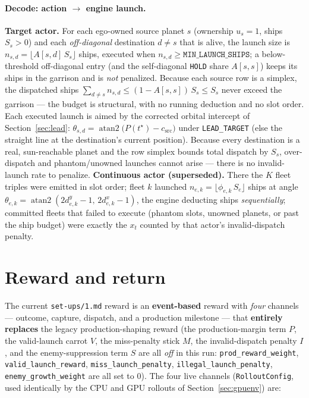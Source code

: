 \documentclass[11pt]{article}
\begin{document}
\paragraph{Decode: action $\to$ engine launch.}\label{sec:decode}
\textbf{Target actor.} For each ego-owned source planet $s$ (ownership $u_s=1$, ships $S_s>0$) and each
\emph{off-diagonal} destination $d\neq s$ that is alive, the launch size is
$n_{s,d}=\lfloor A[s,d]\,S_s\rfloor$ ships, executed when $n_{s,d}\ge\texttt{MIN\_LAUNCH\_SHIPS}$; a
below-threshold off-diagonal entry (and the self-diagonal \texttt{HOLD} share $A[s,s]$) keeps its ships
in the garrison and is \emph{not} penalized. Because each source row is a simplex, the dispatched ships
$\sum_{d\neq s}n_{s,d}\le(1-A[s,s])\,S_s\le S_s$ never exceed the garrison --- the budget is structural,
with no running deduction and no slot order. Each executed launch is aimed by the corrected orbital
intercept of Section~\ref{sec:lead}:
$\theta_{s,d}=\operatorname{atan2}\big(P(t^\star)-c_{\mathrm{src}}\big)$ under \texttt{LEAD\_TARGET}
(else the straight line at the destination's current position). Because every destination is a real,
sun-reachable planet and the row simplex bounds total dispatch by $S_s$, over-dispatch and
phantom/unowned launches cannot arise --- there is no invalid-launch rate to penalize.
\textbf{Continuous actor (superseded).} There the $K$ fleet triples were emitted in slot order; fleet
$k$ launched $n_{e,k}=\lfloor\phi_{e,k}\,S_e\rfloor$ ships at angle
$\theta_{e,k}=\operatorname{atan2}(2d^y_{e,k}-1,\,2d^x_{e,k}-1)$, the engine deducting ships
\emph{sequentially}; committed fleets that failed to execute (phantom slots, unowned planets, or past
the ship budget) were exactly the $x_t$ counted by that actor's invalid-dispatch penalty.

\section{Reward and return}\label{sec:reward}
The current \texttt{set-ups/1.md} reward is an \textbf{event-based} reward with \emph{four} channels ---
outcome, capture, dispatch, and a production milestone --- that \textbf{entirely replaces} the legacy
production-shaping reward (the production-margin term $P$, the valid-launch carrot $V$, the miss-penalty
stick $M$, the invalid-dispatch penalty $I$, and the enemy-suppression term $S$ are all \emph{off} in
this run: \texttt{prod\_reward\_weight}, \texttt{valid\_launch\_reward}, \texttt{miss\_launch\_penalty},
\texttt{illegal\_launch\_penalty}, \texttt{enemy\_growth\_weight} are all set to $0$). The four live
channels (\texttt{RolloutConfig}, used identically by the CPU and GPU rollouts of
Section~\ref{sec:gpuenv}) are:
\end{document}
